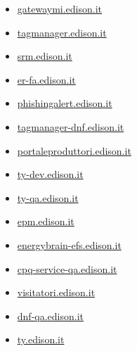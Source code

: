 \documentclass{article}
\begin{document}
\begin{itemize}
            
            \item \href{ https://gatewaymi.edison.it/logon/LogonPoint/index.html }{ gatewaymi.edison.it }
        
            
            \item \href{ http://tagmanager.edison.it/ }{ tagmanager.edison.it }
        
            
            \item \href{ http://srm.edison.it/ }{ srm.edison.it }
        
            
            \item \href{ https://er-fa.edison.it/login/?next=/ }{ er-fa.edison.it }
        
            
            \item \href{ https://phishingalert.edison.it/ }{ phishingalert.edison.it }
        
            
            \item \href{ http://tagmanager-dnf.edison.it/ }{ tagmanager-dnf.edison.it }
        
            
            \item \href{ http://portaleproduttori.edison.it/ }{ portaleproduttori.edison.it }
        
            
            \item \href{ https://ty-dev.edison.it/ }{ ty-dev.edison.it }
        
            
            \item \href{ https://ty-qa.edison.it/ }{ ty-qa.edison.it }
        
            
            \item \href{ http://epm.edison.it/ }{ epm.edison.it }
        
            
            \item \href{ http://energybrain-efs.edison.it/ }{ energybrain-efs.edison.it }
        
            
            \item \href{ https://cpq-service-qa.edison.it/ }{ cpq-service-qa.edison.it }
        
            
            \item \href{ https://visitatori.edison.it/ }{ visitatori.edison.it }
        
            
            \item \href{ https://dnf-qa.edison.it/ }{ dnf-qa.edison.it }
        
            
            \item \href{ https://ty.edison.it/ }{ ty.edison.it }
        

\end{itemize}
\end{document}
